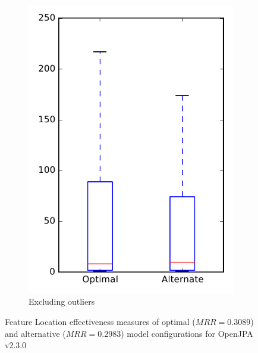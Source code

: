 \begin{figure}
\begin{subfigure}{.4\textwidth}
        \includegraphics[height=0.4\textheight]{figures/combo/flt_rq1_openjpa_no_outlier}
        \caption{Excluding outliers}\label{fig:combo:flt:rq1:openjpa_no_outlier}
    \end{subfigure}
\caption{Feature Location effectiveness measures of optimal ($MRR=0.3089$) and alternative ($MRR=0.2983$) model configurations for OpenJPA v2.3.0}
\label{fig:combo:flt:rq1:openjpa}
\end{figure}
